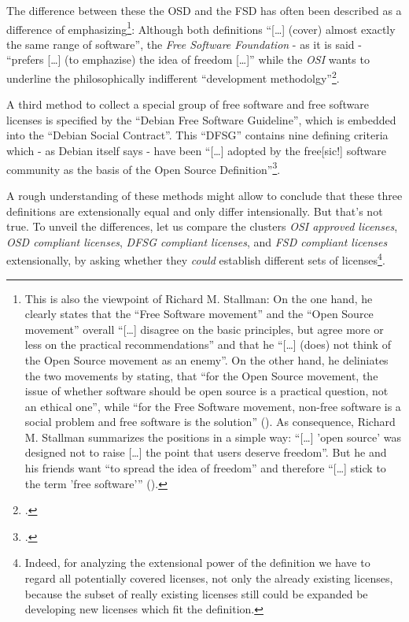 The difference between these the OSD and the FSD has often been described as a
difference of emphasizing\footnote{This is also the viewpoint of Richard M.
Stallman: On the one hand, he clearly states that the \enquote{Free Software
movement} and the \enquote{Open Source movement} overall \enquote{[\ldots]
disagree on the basic principles, but agree more or less on the practical
recommendations} and that he \enquote{[\ldots] (does) not think of the Open
Source movement as an enemy}.  On the other hand, he deliniates the two
movements by stating, that \enquote{for the Open Source movement, the issue of
whether software should be open source is a practical question, not an ethical
one}, while \enquote{for the Free Software movement, non-free software is a
social problem and free software is the solution}
(\cite[cf.][55]{Stallman1998a}). \label{RmsFsPriority} As consequence, Richard
M. Stallman summarizes the positions in a simple way: \enquote{[\ldots] 'open
source' was designed not to raise [\ldots] the point that users deserve
freedom}. But he and his friends want \enquote{to spread the idea of freedom}
and therefore \enquote{[\ldots] stick to the term 'free software'}
(\cite[][59]{Stallman1998a}).}: Although both definitions \enquote{[\ldots]
(cover) almost exactly the same range of software}, the \emph{Free Software
Foundation} - as it is said - \enquote{prefers [\ldots] (to emphazise) the idea
of freedom [\ldots]} while the \emph{OSI} wants to underline the philosophically
indifferent \enquote{development methodolgy}\footcite[pars pro toto:
cf.][232]{Fogel2006a}.

A third method to collect a special group of free software and free software
licenses is specified by the \enquote{Debian Free Software Guideline}, which is
embedded into the \enquote{Debian Social Contract}. This \enquote{DFSG} contains
nine defining criteria which - as Debian itself says - have been
\enquote{[\ldots] adopted by the free[sic!] software community as the basis of
the Open Source Definition}\footcite[cf.][wp]{DFSG2013a}.

A rough understanding of these methods might allow to conclude that these three
definitions are extensionally equal and only differ intensionally.
But that's not true. To unveil the differences, let us compare the clusters
\emph{OSI approved licenses}, \emph{OSD compliant licenses}, \emph{DFSG
compliant licenses}, and \emph{FSD compliant licenses} extensionally, by asking
whether they \emph{could} establish different sets of licenses\footnote{Indeed,
for analyzing the extensional power of the definition we have to regard all
potentially covered licenses, not only the already existing licenses, because
the subset of really existing licenses still could be expanded be developing new
licenses which fit the definition.}.

